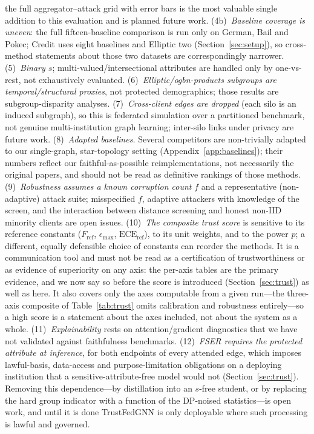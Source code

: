 \documentclass[pdflatex,sn-mathphys-num]{sn-jnl}
\theoremstyle{thmstyleone}%
\theoremstyle{thmstyletwo}%
\theoremstyle{thmstylethree}%
\begin{document}
the full aggregator--attack grid with error bars is the most valuable single
addition to this evaluation and is planned future work. (4b)~\emph{Baseline
coverage is uneven}: the full fifteen-baseline comparison is run only on German,
Bail and Pokec; Credit uses eight baselines and Elliptic two
(Section~\ref{sec:setup}), so cross-method statements about those two datasets
are correspondingly narrower.
(5)~\emph{Binary $s$}; multi-valued/intersectional attributes are handled only by
one-vs-rest, not exhaustively evaluated. (6)~\emph{Elliptic/ogbn-products
subgroups are temporal/structural proxies}, not protected demographics; those
results are subgroup-disparity analyses. (7)~\emph{Cross-client edges are
dropped} (each silo is an induced subgraph), so this is federated simulation over
a partitioned benchmark, not genuine multi-institution graph learning; inter-silo
links under privacy are future work. (8)~\emph{Adapted baselines.} Several
competitors are non-trivially adapted to our single-graph, star-topology setting
(Appendix~\ref{app:baselines}); their numbers reflect our faithful-as-possible
reimplementations, not necessarily the original papers, and should not be read as
definitive rankings of those methods. (9)~\emph{Robustness assumes a known
corruption count} $f$ and a representative (non-adaptive) attack suite;
misspecified $f$, adaptive attackers with knowledge of the screen, and the
interaction between distance screening and honest non-IID minority clients are
open issues. (10)~\emph{The composite trust score} is sensitive to its reference
constants ($F_{\text{ref}}$, $\epsilon_{\max}$, $\mathrm{ECE}_{\text{ref}}$), to
its unit weights, and to the power $p$; a different, equally defensible choice of
constants can reorder the methods. It is a communication tool and must not be
read as a certification of trustworthiness or as evidence of superiority on any
axis: the per-axis tables are the primary evidence, and we now say so before the
score is introduced (Section~\ref{sec:trust}) as well as here. It also covers
only the axes computable from a given run---the three-axis composite of
Table~\ref{tab:trust} omits calibration and robustness entirely---so a high
score is a statement about the axes included, not about the system as a whole.
(11)~\emph{Explainability} rests on attention/gradient diagnostics that we have
not validated against faithfulness benchmarks.
(12)~\emph{FSER requires the protected attribute at inference}, for both
endpoints of every attended edge, which imposes lawful-basis, data-access and
purpose-limitation obligations on a deploying institution that a
sensitive-attribute-free model would not
(Section~\ref{sec:trust}). Removing this dependence---by distillation into an
$s$-free student, or by replacing the hard group indicator with a function of
the DP-noised statistics---is open work, and until it is done TrustFedGNN is
only deployable where such processing is lawful and governed.
\end{document}
